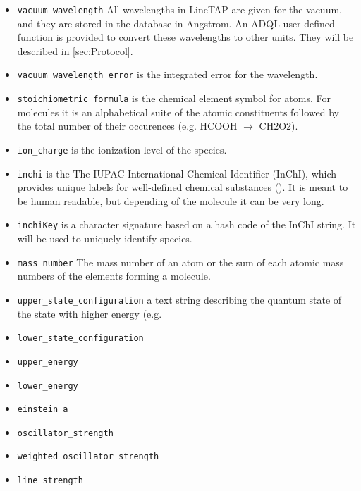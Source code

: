 \documentclass[11pt,a4paper]{ivoa}
\begin{document}
\begin{itemize}
\item \texttt{vacuum\_wavelength}
All wavelengths in LineTAP are given for the vacuum,
and  they are stored in the database in
Angstrom.  An  ADQL user-defined function is provided to convert these
wavelengths to other units. They will be described in
\ref{sec:Protocol}.

\item \texttt{vacuum\_wavelength\_error} is the integrated error for the wavelength.

\item \texttt{stoichiometric\_formula} is the chemical element symbol
for atoms. For molecules it is an alphabetical suite of the atomic
constituents followed by the total number of their occurences (e.g.
HCOOH $\to$ CH2O2).

\item \texttt{ion\_charge} is the ionization level of the species.

\item \texttt{inchi} is the The IUPAC International Chemical Identifier
(InChI), which  provides unique labels for well-defined chemical
substances (\cite{INCHI}). It is meant to be human readable, but
depending of the molecule it can be very long.

\item \texttt{inchiKey} is a character signature based on a hash code of
the InChI string. It will be used to uniquely identify species.

\item \texttt{mass\_number} The mass number of an atom or the sum of
each atomic mass numbers of the elements forming a molecule.

\item \texttt{upper\_state\_configuration} a text string describing the
quantum state of the state with higher energy (e.g. 

\item \texttt{lower\_state\_configuration}
\item \texttt{upper\_energy}
\item \texttt{lower\_energy}

\item \texttt{einstein\_a}
\item \texttt{oscillator\_strength}
\item \texttt{weighted\_oscillator\_strength}
\item \texttt{line\_strength}

\end{itemize}
\end{document}
